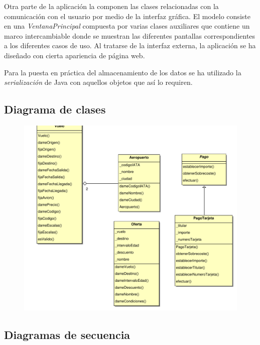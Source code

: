 \documentclass[11pt, a4paper, twoside, titlepage]{article}
\begin{document}
			Otra parte de la aplicación la componen las clases relacionadas con la comunicación con el usuario por medio de la interfaz gráfica. El modelo consiste en una \textit{VentanaPrincipal} compuesta por varias clases auxiliares que contiene un marco intercambiable donde se muestran las diferentes pantallas correspondientes a los diferentes casos de uso. Al tratarse de la interfaz externa, la aplicación se ha diseñado con cierta apariencia de página web.

			Para la puesta en práctica del almacenamiento de los datos se ha utilizado la \textit{serialización} de Java con aquellos objetos que así lo requiren.
			

		\subsection{Diagrama de clases}

			\begin{figure}[H]\centering
				\hspace{-2cm}
				\includegraphics[scale=.57]{diagramas/diagramaclases.pdf}
			\end{figure}

		\subsection{Diagramas de secuencia}
\end{document}
